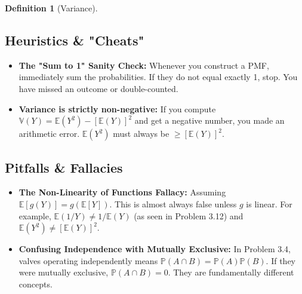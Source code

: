 \documentclass[11pt,letterpaper]{article}
\theoremstyle{definition}
\newtheorem{definition}{Definition}[section]
\theoremstyle{plain}
\theoremstyle{remark}
\newcommand{\E}{\mathbb{E}}
\newcommand{\V}{\mathbb{V}}
\newcommand{\R}{\mathbb{R}}
\newcommand{\Prob}{\mathbb{P}}
\begin{document}
\begin{definition}[Variance]
\begin{center}
\end{center}
\vspace{0.5cm}

\subsection{Heuristics \& "Cheats"}
\begin{itemize}
    \item \textbf{The "Sum to 1" Sanity Check:} Whenever you construct a PMF, immediately sum the probabilities. If they do not equal exactly 1, stop. You have missed an outcome or double-counted.
    \item \textbf{Variance is strictly non-negative:} If you compute $\V(Y) = \E(Y^2) - [\E(Y)]^2$ and get a negative number, you made an arithmetic error. $\E(Y^2)$ must always be $\ge [\E(Y)]^2$.
\end{itemize}

\subsection{Pitfalls \& Fallacies}
\begin{itemize}
    \item \textbf{The Non-Linearity of Functions Fallacy:} Assuming $\E[g(Y)] = g(\E[Y])$. This is almost always false unless $g$ is linear. For example, $\E(1/Y) \neq 1/\E(Y)$ (as seen in Problem 3.12) and $\E(Y^2) \neq [\E(Y)]^2$.
    \item \textbf{Confusing Independence with Mutually Exclusive:} In Problem 3.4, valves operating independently means $\Prob(A \cap B) = \Prob(A)\Prob(B)$. If they were mutually exclusive, $\Prob(A \cap B) = 0$. They are fundamentally different concepts.
\end{itemize}


\end{definition}
\end{document}
